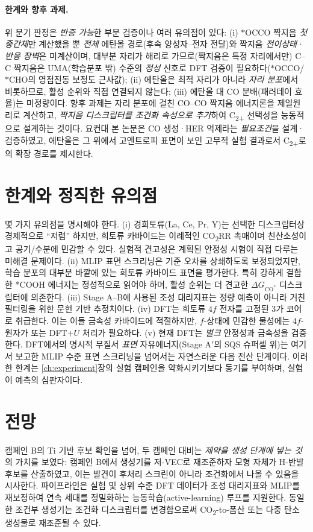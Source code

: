 \documentclass[11pt,a4paper]{report}
\newcommand{\dGCO}{\Delta G_{\mathrm{CO^*}}}
\begin{document}
\paragraph{한계와 향후 과제.} 위 분기 판정은 \emph{반증 가능}한 부분 검증이나 여러 유의점이 있다:
(i) $*$OCCO 짝지음 \emph{첫 중간체}만 계산했을 뿐 \emph{전체} 에탄올 경로(후속 양성자--전자 전달)와
짝지음 \emph{전이상태·반응 장벽}은 미계산이며, 대부분 자리가 해리로 가므로(짝지음은 특정 자리에서만)
C--C 짝지음은 UMA(학습분포 밖) 수준의 \emph{정성} 신호로 DFT 검증이 필요하다($*$OCCO/$*$CHO의 영점진동
보정도 근사값); (ii) 에탄올은 최적 자리가 아니라
\emph{자리 분포}에서 비롯하므로, 활성 순위와 직접 연결되지 않는다; (iii) 에탄올 대 CO 분배(패러데이
효율)는 미정량이다. 향후 과제는 자리 분포에 걸친 CO--CO 짝지음 에너지론을 제일원리로 계산하고,
\emph{짝지음 디스크립터를 조건화 속성으로 추가}하여 C\textsubscript{2+} 선택성을 능동적으로 설계하는
것이다. 요컨대 본 논문은 CO 생성·HER 억제라는 \emph{필요조건}을 설계·검증하였고, 에탄올은 그 위에서
고엔트로피 표면이 보인 고무적 실험 결과로서 C\textsubscript{2+}로의 확장 경로를 제시한다.

\section{한계와 정직한 유의점}
몇 가지 유의점을 명시해야 한다. (i) 경희토류(La, Ce, Pr, Y)는 선택한 디스크립터상 경제적으로 ``저렴''
하지만, 희토류 카바이드는 이례적인 CO\textsubscript{2}RR 촉매이며 친산소성이고 공기/수분에 민감할 수
있다. 실험적 견고성은 계획된 안정성 시험이 직접 다루는 미해결 문제이다. (ii) MLIP 표면 스크리닝은 기준
오차를 상쇄하도록 보정되었지만, 학습 분포의 대부분 바깥에 있는 희토류 카바이드 표면을 평가한다. 특히
강하게 결합한 *COOH 에너지는 정성적으로 읽어야 하며, 활성 순위는 더 견고한 $\dGCO$ 디스크립터에 의존한다.
(iii) Stage A--B에 사용된 조성 대리지표는 정량 예측이 아니라 거친 필터링을 위한 문헌 기반 추정치이다.
(iv) DFT는 희토류 $4f$ 전자를 고정된 3가 코어로 취급한다. 이는 이들 금속성 카바이드에 적절하지만,
$f$-상태에 민감한 물성에는 $4f$-원자가 또는 DFT$+U$ 처리가 필요하다. (v) 현재 DFT는 \emph{벌크} 안정성과
금속성을 검증한다. DFT에서의 명시적 무질서 \emph{표면} 자유에너지(Stage A$'$의 SQS 슈퍼셀 위)는 여기서
보고한 MLIP 수준 표면 스크리닝을 넘어서는 자연스러운 다음 전산 단계이다. 이러한 한계는
\ref{ch:experiment}장의 실험 캠페인을 약화시키기보다 동기를 부여하며, 실험이 예측의 심판자이다.

\section{전망}
캠페인 B의 Ti 기반 후보 확인을 넘어, 두 캠페인 대비는 \emph{제약을 생성 단계에 넣는 것}의 가치를 보였다:
캠페인 B에서 생성기를 저-VEC로 재조준하자 모형 자체가 H-반발 후보를 산출하였고, 이는 발견이 후처리
스크린이 아니라 조건화에서 나올 수 있음을 시사한다. 파이프라인은 실험 및 상위 수준 DFT 데이터가 조성
대리지표와 MLIP를 재보정하여 연속 세대를 정밀화하는 능동학습(active-learning) 루프를 지원한다. 동일한
조건부 생성기는 조건화 디스크립터를 변경함으로써 CO\textsubscript{2}-to-폼산 또는 다중 탄소 생성물로
재조준될 수 있다.
\end{document}
